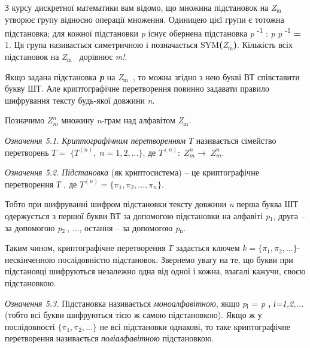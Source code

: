 \documentclass[a4paper]{article}
\newcommand\textsubscript[1]{\ensuremath{{}_{\text{#1}}}}
\newcounter{}
\begin{document}
З курсу дискретної математики вам відомо, що множина підстановок на
\textit{Z}\textit{\textsubscript{m}}\textsubscript{ } утворює групу відносно
операції множення. Одиницею цієї групи є тотожна підстановка; для кожної
підстановки \textit{\textgreek{p}}\textbf{ } існує обернена підстановка
\textit{\textgreek{p}}\textit{ }\textsuperscript{{}-1} :
\textit{\textgreek{p}}\textsf{\textit{ }}\textit{\textgreek{p}}
\textsuperscript{{}-1}\textbf{ = }1. Ця група називається симетричною і
позначається SYM\textbf{(}\textit{Z}\textit{\textsubscript{m}}\textbf{)}.
Кількість всіх підстановок на
\textit{Z}\textit{\textsubscript{m}}\textsubscript{ } дорівнює
\textit{m}\textit{!}.

Якщо задана підстановка \textbf{\textit{\textgreek{p}}}\textbf{\textit{ }} на
\textit{Z}\textit{\textsubscript{m}}\textsubscript{ }, то можна згідно з нею
букві ВТ  співставити букву ШТ. Але криптографічне перетворення повинно
задавати правило шифрування тексту будь-якої довжини \textit{n}.

Позначимо  ${Z_{{m}}^{{n}}}$ множину \textit{n}{}-грам над алфавітом
\textit{Z}\textit{\textsubscript{m}}.

\textit{Означення 5.1.}\textit{ Криптографічним перетворенням Т }називається
сімейство перетворень  ${T=\;\{T^{{(n)}},\;n=1,2,\text{.}\text{.}\text{.}\}}$,
де  ${T^{{(n)}}:\;Z_{{m}}^{{n}}\rightarrow \;Z_{{m}}^{{n}}}$\textsf{.}

\textit{Означення 5.2.}\textit{ Підстановка}\textbf{\textit{ }}(як
криптосистема) – це криптографічне перетворення \textit{Т}\textbf{\textit{ }},
де  ${T^{{(n)}}=\{\pi _{{1}},\pi _{{2}},\text{.}\text{.}\text{.},\pi
_{{n}}\}}$.

Тобто при шифруванні шифром підстановки тексту довжини \textit{n} перша буква ШТ
одержується з першої букви ВТ за допомогою підстановки на алфавіті
\textit{\textgreek{p}}\textsubscript{1}, друга – за допомогою
\textit{\textgreek{p}}\textsubscript{2 }, ..., остання – за допомогою
\textit{\textgreek{p}}\textit{\textsubscript{n}}.

Таким чином, криптографічне перетворення \textit{Т} задається ключем  ${k=\{\pi
_{{1}},\pi _{{2}},\text{.}\text{.}\text{.}\}}${}- нескінченною послідовністю
підстановок. Звернемо увагу на те, що букви при підстановці шифруються
незалежно одна від одної і кожна, взагалі кажучи, своєю підстановкою.

\textit{Означення 5.3.}\textit{ }Підстановка називається
\textit{моноалфавітною}, якщо\textbf{
}\textit{\textgreek{p}}\textit{\textsubscript{і}} =\textsf{\textit{
}}\textit{\textgreek{p}}\textbf{ , }\textit{і=1,2,...} (тобто всі букви
шифруються тією ж самою підстановкою). Якщо ж у послідовності   ${\{\pi
_{{1}},\pi _{{2}},\text{.}\text{.}\text{.}\}}$ не всі підстановки однакові, то
таке криптографічне перетворення називається \textit{поліалфавітною}
підстановкою.
\end{document}
